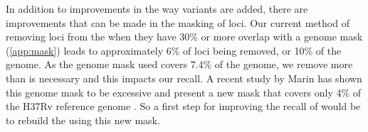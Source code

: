 In addition to improvements in the way variants are added, there are improvements that can be made in the masking of loci. Our current method of removing loci from the \prg{} when they have 30\% or more overlap with a genome mask (\autoref{app:mask}) leads to approximately 6\% of loci being removed, or 10\% of the genome. As the genome mask used covers 7.4\% of the genome, we remove more than is necessary and this impacts our recall. A recent study by Marin \etal{} has shown this genome mask to be excessive and present a new mask that covers only 4\% of the H37Rv reference genome \cite{marin2021}. So a first step for improving the recall of \pandora{} would be to rebuild the \prg{} using this new mask.